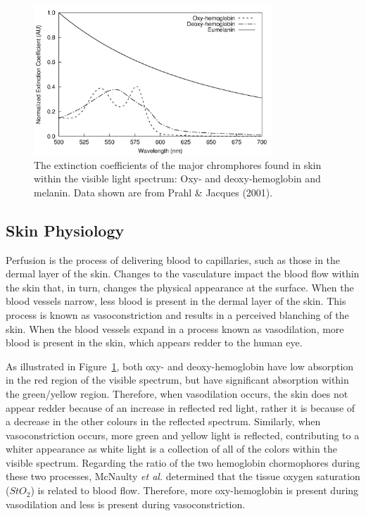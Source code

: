 \begin{figure}
	\centering \includegraphics[width=0.8\textwidth]{figures/intro-skin_chromophores.png}
	\caption[The extinction coefficient spectra for the major chromophores of skin within the visible light spectrum]{\label{fig:intro-skin_chromophores}The extinction coefficients of the major chromphores found in skin within the visible light spectrum: Oxy- and deoxy-hemoglobin and melanin. Data shown are from Prahl \& Jacques (2001).\cite{Prahl2001}}
\end{figure}

\subsection{Skin Physiology}
Perfusion is the process of delivering blood to capillaries, such as those in the dermal layer of the skin. Changes to the vasculature impact the blood flow within the skin that, in turn, changes the physical appearance at the surface. When the blood vessels narrow, less blood is present in the dermal layer of the skin. This process is known as vasoconstriction and results in a perceived blanching of the skin. When the blood vessels expand in a process known as vasodilation, more blood is present in the skin, which appears redder to the human eye.

As illustrated in Figure~\ref{fig:intro-skin_chromophores}, both oxy- and deoxy-hemoglobin have low absorption in the red region of the visible spectrum, but have significant absorption within the green/yellow region. Therefore, when vasodilation occurs, the skin does not appear redder because of an increase in reflected red light, rather it is because of a decrease in the other colours in the reflected spectrum. Similarly, when vasoconstriction occurs, more green and yellow light is reflected, contributing to a whiter appearance as white light is a collection of all of the colors within the visible spectrum. Regarding the ratio of the two hemoglobin chormophores during these two processes, McNaulty \emph{et al.} determined that the tissue oxygen saturation ($StO_2$) is related to blood flow.\cite{McNulty2011} Therefore, more oxy-hemoglobin is present during vasodilation and less is present during vasoconstriction.

